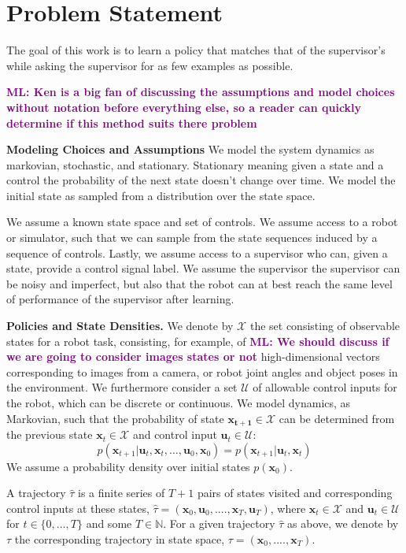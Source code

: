 \documentclass[10pt, conference]{ieeeconf}      %
\newcommand{\bu}{\mathbf{u}}
\newcommand{\bx}{\mathbf{x}}
\newcommand{\mlnote}[1]{\ifthenelse{ \boolean{include-notes}}%
 {\textcolor{purple}{\textbf{ML: #1}}}{}}
\begin{document}
\section{Problem Statement}
The goal of this work is to learn a policy that matches that of the supervisor's while asking the supervisor for as few examples as possible.

\mlnote{Ken is a big fan of  discussing the assumptions and model choices without notation before everything else, so a reader can quickly determine if this method suits there problem}

\noindent\textbf{Modeling Choices and Assumptions}  We model the system dynamics as markovian, stochastic, and stationary. Stationary meaning  given a state and a control the probability of the next state doesn't change over time. We model the initial state as sampled from a distribution over the state space.

We assume a known state space and set of controls. We assume access to a robot or simulator, such that we  can sample from the state sequences induced by a sequence of controls.   Lastly, we assume access to a supervisor who can, given a state, provide a control signal label. We assume the supervisor the supervisor can be noisy and imperfect, but also that the robot can at best reach the same level of performance of the supervisor after learning. 


\noindent\textbf{Policies and State Densities.}
We denote by $\mathcal{X}$ the set consisting of observable states for a robot task, consisting, for example, of \mlnote{We should discuss if we are going to consider images states or not}
high-dimensional vectors corresponding to images from a camera, or robot joint angles and object poses in the environment.
We furthermore consider a set $\mathcal{U}$ of allowable control inputs for the robot, which can be discrete or
continuous. We model dynamics, as Markovian, such that the probability of state $\mathbf{x_{t+1}}\in
\mathcal{X}$ can be determined from the previous state $\mathbf{x}_t\in\mathcal{X}$ and control input $\mathbf{u}_t\in
\mathcal{U}$: 
$$p(\bx_{t+1}|\bu_{t},\bx_{t}, \ldots, \bu_{0}, \bx_{0})=p(\bx_{t+1}|\bu_{t}, \bx_t)$$
We assume a probability density over initial states $p(\bx_0)$.

A trajectory $\hat{\tau}$ is a finite series of $T+1$ pairs of states visited and corresponding
control inputs at these states, $\hat{\tau} = (\mathbf{x}_0,\mathbf{u}_0, ...., \mathbf{x}_T,\mathbf{u}_T)$, where $\bx_t\in \mathcal{X}$
and $\bu_t\in \mathcal{U}$ for $t\in \{0, \ldots, T\}$ and some $T\in \mathbb{N}$.  
For a given trajectory $\hat{\tau}$ as above, we denote by ${\tau}$ the corresponding trajectory in state space,
${\tau} = (\bx_0,....,\bx_T)$.
\end{document}
